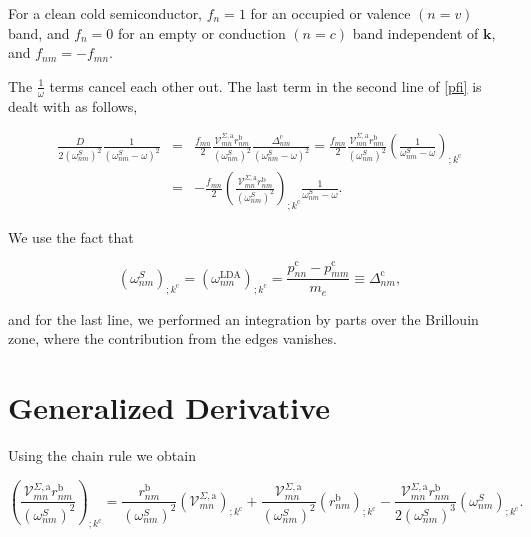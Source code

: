 \documentclass[11pt]{article}
\begin{document}
For a clean cold semiconductor, $f_{n} = 1$ for an occupied or valence $(n = v)$ band, and $f_{n} = 0$ for an empty or conduction $(n = c)$ band independent of $\mathbf{k}$, and $f_{nm}=-f_{mn}$.

The $\frac{1}{\omega}$ terms cancel each other out. The last term in the second line of \eqref{pfi} is dealt with as follows,

\begin{eqnarray}\label{dresn}
\frac{D}{2(\omega^S_{nm})^2}\frac{1}{(\omega^S_{nm}-\omega)^2} 
&=& \frac{f_{mn}}{2}\frac{\mathcal{V}^{\Sigma,\text{a}}_{mn}r^{\text{b}}_{nm}}{(\omega^S_{nm})^2}\frac{\Delta^{\text{c}}_{nm}}{(\omega^S_{nm}-\omega)^2} = \frac{f_{mn}}{2}\frac{\mathcal{V}^{\Sigma,\text{a}}_{mn}r^{\text{b}}_{nm}}{(\omega^S_{nm})^2}\left(\frac{1}{\omega^S_{nm}-\omega}\right)_{;k^{\text{c}}}\nonumber\\
&=& -\frac{f_{mn}}{2}\left(\frac{\mathcal{V}^{\Sigma,\text{a}}_{mn}r^{\text{b}}_{nm}}{(\omega^S_{nm})^2}\right)_{;k^{\text{c}}}\frac{1}{\omega^S_{nm}-\omega}.
\end{eqnarray} 

We use the fact that

\begin{equation}\label{wk}
(\omega^S_{nm})_{;k^{\text{c}}}=(\omega^\text{LDA}_{nm})_{;k^{\text{c}}} = \frac{p_{nn}^{\text{c}}-p_{mm}^{\text{c}}}{m_{e}} \equiv \Delta_{nm}^{\text{c}},
\end{equation}

and for the last line, we performed an integration by parts over the Brillouin zone, where the contribution from the edges vanishes.

\section{Generalized Derivative}

Using the chain rule we obtain

\begin{equation}\label{chrn}
\left(\frac{\mathcal{V}^{\Sigma,\text{a}}_{mn}r^{\text{b}}_{nm}}{(\omega^S_{nm})^2}\right)_{;k^{\text{c}}} = \frac{r^{\text{b}}_{nm}}{(\omega^S_{nm})^2}\left(\mathcal{V} ^{\Sigma,\text{a}}_{mn}\right)_{;k^{\text{c}}} + \frac{\mathcal{V}^{\Sigma,\text{a}}_{mn}}{(\omega^S_{nm})^2}\left(r^{\text{b}}_{nm}\right)_{;k^{\text{c}}} - \frac{\mathcal{V}^{\Sigma,\text{a}}_{mn}r^{\text{b}}_{nm}}{2(\omega^S_{nm})^3}\left(\omega^S_{nm}\right)_{;k^{\text{c}}}.
\end{equation}
\end{document}
